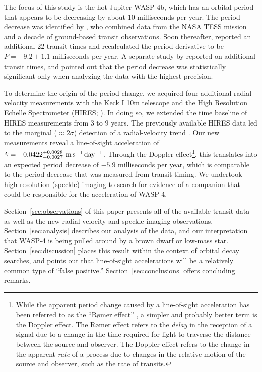 \documentclass[12pt,twocolumn,tighten,trackchanges]{aastex62}
\begin{document}
The focus of this study is the hot Jupiter WASP-4b, which has an
orbital period that appears to be decreasing by about 10 milliseconds
per year.  The period decrease was identified by \citep[][hereafter
]{bouma_wasp4b_2019}, who combined data
from the NASA TESS mission \citep{ricker_transiting_2015} and a decade
of ground-based transit observations. Soon thereafter,
\citet{southworth_transit_2019} reported an additional 22 transit
times and recalculated the period derivative to be $\dot{P} = -9.2 \pm
1.1$ milliseconds per year.  A separate study by \citet{baluev_2019}
reported on additional transit times, and pointed out that the period
decrease was statistically significant only when analyzing the data
with the highest precision.

To determine the origin of the period change, we acquired four
additional radial velocity measurements with the Keck I 10m telescope
and the High Resolution Echelle Spectrometer (HIRES;
\citealt{vogt_hires_1994}).  In doing so, we extended the time
baseline of HIRES measurements from 3 to 9 years.  The previously
available HIRES data led to the marginal ($\approx$$2\sigma$)
detection of a radial-velocity trend \citep{knutson_friends_2014}.
Our new measurements reveal a line-of-sight acceleration of
$\dot{\gamma} = -0.0422^{+0.0028}_{-0.0027}\ {\rm
m\,s^{-1}\,day^{-1}}$.  Through the Doppler effect\footnote{While the
apparent period change caused by a line-of-sight acceleration has been
referred to as the ``R{\o}mer effect'' \citep{yee_orbit_2020}, a
simpler and probably better term is the Doppler effect. The R{\o}mer
effect refers to the {\it delay} in the reception of a signal due to a
change in the time required for light to traverse the distance between
the source and observer. The Doppler effect refers to the change in
the apparent {\it rate} of a process due to changes in the relative
motion of the source and observer, such as the rate of transits.},
this translates into an expected period decrease of $-5.9$
milliseconds per year, which is comparable to the period decrease that
was measured from transit timing.  We undertook high-resolution
(speckle) imaging to search for evidence of a companion that could be
responsible for the acceleration of WASP-4.

Section~\ref{sec:observations} of this paper presents all of the
available transit data as well as the new radial velocity and speckle
imaging observations.  Section~\ref{sec:analysis} describes our
analysis of the data, and our interpretation that WASP-4 is being
pulled around by a brown dwarf or low-mass star.
Section~\ref{sec:discussion} places this result within the context of
orbital decay searches, and points out that line-of-sight
accelerations will be a relatively common type of ``false positive.''
Section~\ref{sec:conclusions} offers concluding remarks.
\end{document}
